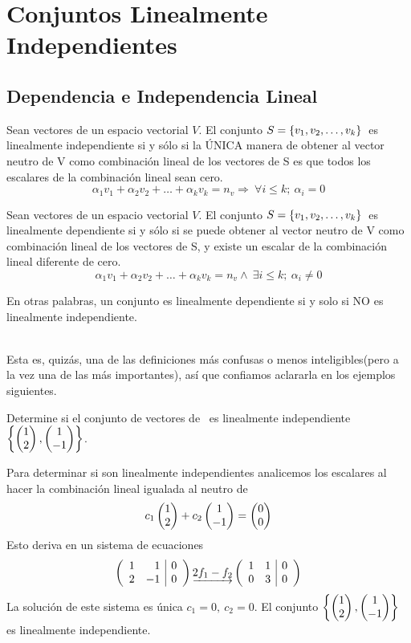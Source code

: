 \chapter{Conjuntos Linealmente Independientes}

\section{Dependencia e Independencia Lineal}
\begin{dfn}
Sean  vectores de un espacio vectorial $V$. El conjunto $S=\conjvect{v}{k}$\ es linealmente independiente si y sólo si la ÚNICA manera de obtener al vector neutro de V como combinación lineal de los vectores de S es que todos los escalares de la combinación lineal sean cero.
\[\alpha_1 v_1+
\alpha_2 v_2+
\ldots+
\alpha_k v_k =
n_v
\Rightarrow\ 
\forall i \leq k;
\ \alpha_i=0
\] 
\end{dfn}
\begin{dfn}
Sean  vectores de un espacio vectorial $V$. El conjunto $S=\conjvect{v}{k}$\ es linealmente dependiente si y sólo si se puede obtener al vector neutro de V como combinación lineal de los vectores de S, y existe un escalar de la combinación lineal diferente de cero.
\[\alpha_1 v_1+
\alpha_2 v_2+
\ldots+
\alpha_k v_k =
n_v
\wedge\ 
\exists i \leq k;
\ \alpha_i\neq 0
\] 
\end{dfn}
En otras palabras, un conjunto es linealmente dependiente si y solo si NO  es linealmente independiente.

~\\
Esta es, quiz\'as, una de las definiciones más confusas o menos inteligibles(pero a la vez una de las más importantes), as\'i que confiamos aclararla en los ejemplos siguientes.
~\\
\begin{ejemplo}
Determine si el conjunto de vectores de \rdos\  es linealmente independiente $\left\{
\vectrdos{1}{2}, \vectrdos{1}{-1}\right\}$.
\end{ejemplo}

Para determinar si son linealmente independientes analicemos los escalares al hacer la combinación lineal igualada al neutro de \rdos
\[c_1\vectrdos{1}{2}+
c_2\vectrdos{1}{-1}=
\vectrdos{0}{0}\]
Esto deriva en un sistema de ecuaciones
$$\reducir{rr|c}{1&1&0\\2&-1&0}
\underrightarrow{2f_1 - f_2}
\reducir{rr|c}{1&1&0\\0&3&0}$$
La solución de este sistema es única $c_1=0,\ c_2=0$. El conjunto $\left\{
\vectrdos{1}{2}, \vectrdos{1}{-1}\right\}$ es linealmente independiente.


